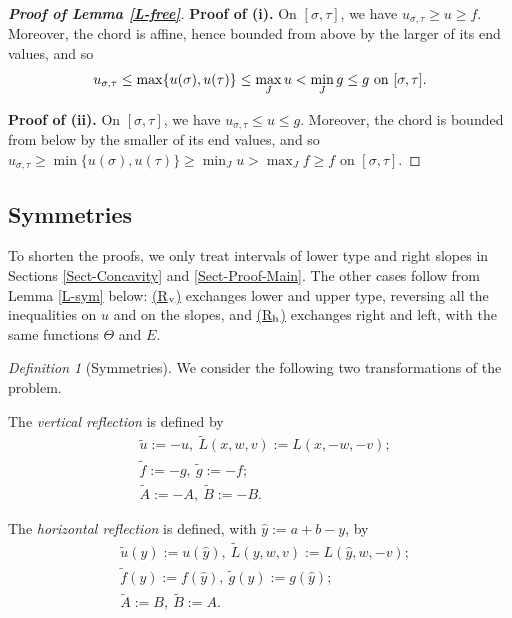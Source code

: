 \documentclass[reqno,12pt]{amsart}
\numberwithin{equation}{section}
\newcommand{\Rv}{\hyperref[HypS1]{{\sf (R$_{\rm v}$)}}}
\newcommand{\Rh}{\hyperref[HypS2]{{\sf (R$_{\rm h}$)}}}
\theoremstyle{remark}
\newtheorem{definition}[theorem]{Definition}
\begin{document}
\begin{proof}[\bf Proof of Lemma \ref{L-free}]
{\bf Proof of (i).} On $[\sigma,\tau]$, we have $u_{\sigma,\tau}\geq u\geq f$. Moreover, the chord is affine, hence bounded from above by the larger of its end values, and so
\begin{equation*}
u_{\sigma,\tau}\leq\max\{u(\sigma),u(\tau)\}\leq\max_Ju<\min_Jg\leq g\hbox{ on }[\sigma,\tau].
\end{equation*}

\medskip

{\bf Proof of (ii).} On $[\sigma,\tau]$, we have $u_{\sigma,\tau}\leq u\leq g$. Moreover, the chord is bounded from below by the smaller of its end values, and so $u_{\sigma,\tau}\geq\min\{u(\sigma),u(\tau)\}\geq\min_Ju>\max_Jf\geq f$ on $[\sigma,\tau]$.
\end{proof}

\subsection{Symmetries} To shorten the proofs, we only treat intervals of lower type and right slopes in Sections \ref{Sect-Concavity} and \ref{Sect-Proof-Main}. The other cases follow from Lemma \ref{L-sym} below: \Rv{} exchanges lower and upper type, reversing all the inequalities on $u$ and on the slopes, and \Rh{} exchanges right and left, with the same functions $\Theta$ and $E$.

\begin{definition}[Symmetries]\label{Def-sym}
We consider the following two transformations of the problem.
\begin{HypSym}[itemsep=0.5em, topsep=0.5em]
\item[{\sf (R$_{\rm v}$)}]\label{HypS1} The {\em vertical reflection} is defined by
\begin{align*}
&\widetilde u:=-u,\ \widetilde L(x,w,v):=L(x,-w,-v);\\
&\widetilde f:=-g,\ \widetilde g:=-f;\\
&\widetilde A:=-A,\ \widetilde B:=-B.
\end{align*}
\item[{\sf (R$_{\rm h}$)}]\label{HypS2} The {\em horizontal reflection} is defined, with $\widehat y:=a+b-y$, by
\begin{align*}
&\widetilde u(y):=u(\widehat y),\ \widetilde L(y,w,v):=L(\widehat y,w,-v);\\
&\widetilde f(y):=f(\widehat y),\ \widetilde g(y):=g(\widehat y);\\
&\widetilde A:=B,\ \widetilde B:=A.
\end{align*}
\end{HypSym}
\end{definition}
\end{document}
